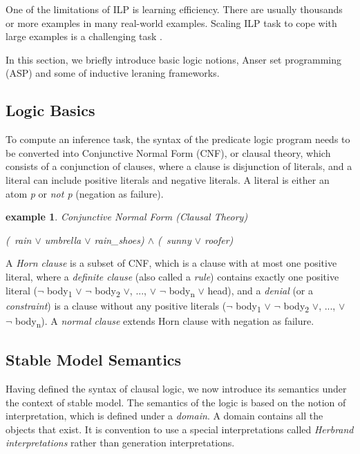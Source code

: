 \documentclass[12pt,twoside]{report}
\newtheorem{examp}{example}[section]
\begin{document}
One of the limitations of ILP is learning efficiency. There are usually thousands or more examples in many real-world examples. Scaling ILP task to cope with large examples is a challenging task \cite{Muggleton1993}.

In this section, we briefly introduce basic logic notions, Anser set programming (ASP) and some of inductive leraning frameworks.

\subsection{Logic Basics}


To compute an inference task, the syntax of the predicate logic program needs to be converted into Conjunctive Normal Form (CNF), or clausal theory, which consists of a conjunction of clauses, where a clause is disjunction of literals, and a literal can include positive literals and negative literals. A literal is either an atom \textit{p} or \textit{not p} (negation as failure).

\begin{examp} \normalfont Conjunctive Normal Form (Clausal Theory)
\begin{center}
 \textit{(~rain $\vee$ umbrella $\vee$ rain\_shoes) $\wedge$ (~sunny $\vee$ roofer)}
\end{center}
\end{examp}

A \textit{Horn clause} is a subset of CNF, which is a clause with at most one positive literal, where a \textit{definite clause} (also called a \textit{rule}) contains exactly one positive literal ($\neg$ body\textsubscript{1} $\vee$ $\neg$ body\textsubscript{2} $\vee$, ..., $\vee$ $\neg$ body\textsubscript{n} $\vee$ head), and a \textit{denial} (or a \textit{constraint}) is a clause without any positive literals ($\neg$ body\textsubscript{1} $\vee$ $\neg$ body\textsubscript{2} $\vee$, ..., $\vee$ $\neg$ body\textsubscript{n}).
A \textit{normal clause} extends Horn clause with negation as failure.

\subsection{Stable Model Semantics}

Having defined the syntax of clausal logic, we now introduce its semantics under the context of stable model. The semantics of the logic is based on the notion of interpretation, which is defined under a \textit{domain}. A domain contains all the objects that exist. It is convention to use a special interpretations called \textit{Herbrand interpretations} rather than generation interpretations.
\end{document}
